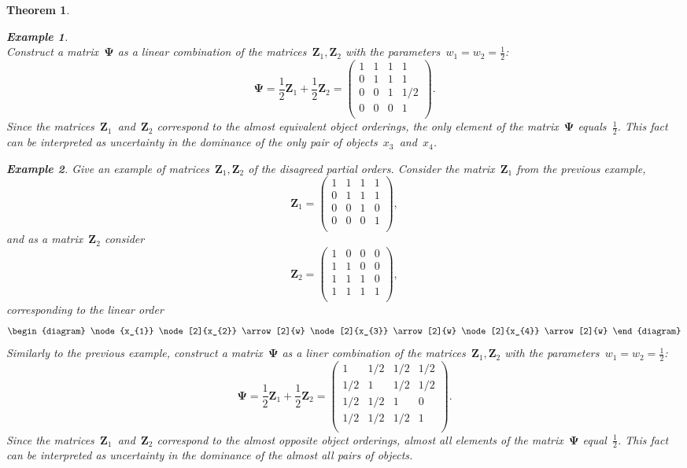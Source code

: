 \documentclass[12pt,preprint]{elsarticle}
\newcommand{\bZ}{\mathbf{Z}}
\newcommand{\bPsi}{\boldsymbol{\Psi}}
\newtheorem{Theorem}{Theorem}
\newtheorem{Ex}{Example}
\begin{document}
\begin{Theorem}
\begin{Ex}
\[\]
Construct a matrix~$\bPsi$ as a linear combination of the matrices~$\bZ_1,\bZ_2$ with the parameters~$w_1=w_2=\frac{1}{2}$:
\[
\bPsi=\frac{1}{2}\bZ_1+\frac{1}{2}\bZ_2=
\begin{pmatrix}
1 & 1 & 1 & 1 \\
0 & 1 & 1 & 1 \\
0 & 0 & 1 & 1/2 \\
0 & 0 & 0 & 1 \\
\end{pmatrix}.
\]
Since the matrices~$\bZ_1$~and~$\bZ_2$ correspond to the almost equivalent object orderings, the only element of the matrix~$\bPsi$ equals~$\frac{1}{2}$. This fact can be interpreted as uncertainty in the dominance of the only pair of objects~$x_3$~and~$x_4$.
\end{Ex}

\begin{Ex} Give an example of matrices~$\bZ_1,\bZ_2$ of the disagreed partial orders. Consider the matrix~$\bZ_1$ from the previous example,
\[
\bZ_1=
\begin{pmatrix}
1 & 1 & 1 & 1 \\
0 & 1 & 1 & 1 \\
0 & 0 & 1 & 0 \\
0 & 0 & 0 & 1 \\
\end{pmatrix},
\]
and as a matrix~$\bZ_2$ consider
\[
\bZ_2=
\begin{pmatrix}
1 & 0 & 0 & 0 \\
1 & 1 & 0 & 0 \\
1 & 1 & 1 & 0 \\
1 & 1 & 1 & 1 \\
\end{pmatrix},
\]
corresponding to the linear order
\[
\begin{diagram}
\node{x_{1}}
\node[2]{x_{2}} \arrow[2]{w}
\node[2]{x_{3}} \arrow[2]{w}
\node[2]{x_{4}} \arrow[2]{w}
\end{diagram}
\]
Similarly to the previous example, construct a matrix~$\bPsi$ as a liner combination of the matrices~$\bZ_1,\bZ_2$ with the parameters~$w_1=w_2=\frac{1}{2}$:
\[
\bPsi=\frac{1}{2}\bZ_1+\frac{1}{2}\bZ_2=
\begin{pmatrix}
1 & 1/2 & 1/2 & 1/2 \\
1/2 & 1 & 1/2 & 1/2 \\
1/2 & 1/2 & 1 & 0 \\
1/2 & 1/2 & 1/2 & 1 \\
\end{pmatrix}.
\]
Since the matrices~$\bZ_1$~and~$\bZ_2$ correspond to the almost opposite object orderings, almost all elements of the matrix~$\bPsi$ equal~$\frac{1}{2}$. This fact can be interpreted as uncertainty in the dominance of the almost all pairs of objects.
\end{Ex}


\end{Theorem}
\end{document}

